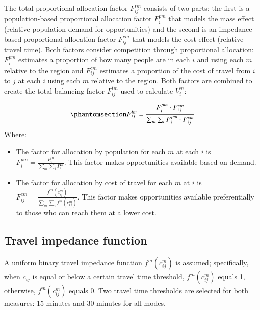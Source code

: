 \documentclass[
  authoryear,
  preprint,
  3p]{elsarticle}
\providecommand{\tightlist}{%
  \setlength{\itemsep}{0pt}\setlength{\parskip}{0pt}}\usepackage{longtable,booktabs,array}
\def\tightlist{}
\begin{document}
The total proportional allocation factor \(F^{tm}_{ij}\) consists of two
parts: the first is a population-based proportional allocation factor
\(F_i^{pm}\) that models the mass effect (relative population-demand for
opportunities) and the second is an impedance-based proportional
allocation factor \(F_{ij}^{cm}\) that models the cost effect (relative
travel time). Both factors consider competition through proportional
allocation: \(F^{pm}_{i}\) estimates a proportion of how many people are
in each \(i\) and using each \(m\) relative to the region and
\(F^{cm}_{ij}\) estimates a proportion of the cost of travel from \(i\)
to \(j\) at each \(i\) using each \(m\) relative to the region. Both
factors are combined to create the total balancing factor
\(F^{tm}_{ij}\) used to calculate \(V^m_i\):

\begin{equation}\phantomsection\label{eq-3}{
F^{tm}_{ij} = \frac{F^{pm}_{i} \cdot F^{cm}_{ij}}{\sum_{m} \sum_{i} F^{pm}_{i} \cdot F^{cm}_{ij}}
}\end{equation} \noindent Where:

\begin{itemize}
\tightlist
\item
  The factor for allocation by population for each \(m\) at each \(i\)
  is \(F^{pm}_{i} = \frac{P_{i}^m}{\sum_{m}\sum_{i} P_{i}^m}\). This
  factor makes opportunities available based on demand.
\item
  The factor for allocation by cost of travel for each \(m\) at \(i\) is
  \(F_{ij}^{cm} = \frac{f^m(c_{ij}^m)}{\sum_{m} \sum_{i} f^m(c_{ij}^m)}\).
  This factor makes opportunities available preferentially to those who
  can reach them at a lower cost.
\end{itemize}

\subsection{Travel impedance function}\label{travel-impedance-function}

A uniform binary travel impedance function \(f^m(c_{ij}^m)\) is assumed;
specifically, when \(c_{ij}\) is equal or below a certain travel time
threshold, \(f^m(c_{ij}^m)\) equals 1, otherwise, \(f^m(c_{ij}^m)\)
equals 0. Two travel time thresholds are selected for both measures: 15
minutes and 30 minutes for all modes.
\end{document}
